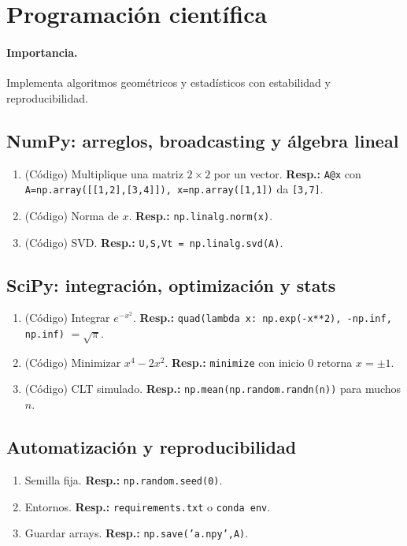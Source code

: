 	\section{Programación científica}
	\paragraph{Importancia.} Implementa algoritmos geométricos y estadísticos con estabilidad y reproducibilidad.
	
	\subsection*{NumPy: arreglos, broadcasting y álgebra lineal}
	\begin{enumerate}
		\item (Código) Multiplique una matriz $2\times2$ por un vector. \textbf{Resp.:} \texttt{A@x} con \texttt{A=np.array([[1,2],[3,4]]), x=np.array([1,1])} da \texttt{[3,7]}.
		\item (Código) Norma de $x$. \textbf{Resp.:} \texttt{np.linalg.norm(x)}.
		\item (Código) SVD. \textbf{Resp.:} \texttt{U,S,Vt = np.linalg.svd(A)}.
	\end{enumerate}
	
	\subsection*{SciPy: integración, optimización y stats}
	\begin{enumerate}
		\item (Código) Integrar $e^{-x^2}$. \textbf{Resp.:} \texttt{quad(lambda x: np.exp(-x**2), -np.inf, np.inf)} $=\sqrt{\pi}$.
		\item (Código) Minimizar $x^4-2x^2$. \textbf{Resp.:} \texttt{minimize} con inicio 0 retorna $x=\pm1$.
		\item (Código) CLT simulado. \textbf{Resp.:} \texttt{np.mean(np.random.randn(n))} para muchos $n$.
	\end{enumerate}
	
	\subsection*{Automatización y reproducibilidad}
	\begin{enumerate}
		\item Semilla fija. \textbf{Resp.:} \texttt{np.random.seed(0)}.
		\item Entornos. \textbf{Resp.:} \texttt{requirements.txt} o \texttt{conda env}.
		\item Guardar arrays. \textbf{Resp.:} \texttt{np.save('a.npy',A)}.
	\end{enumerate}
	
